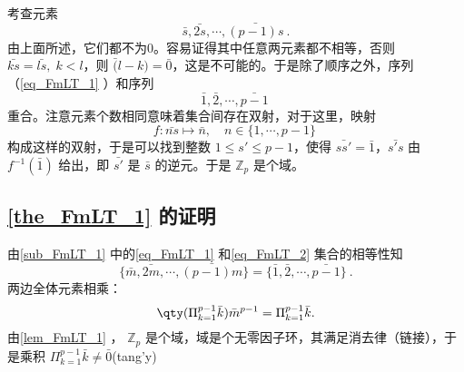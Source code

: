 考查元素 
\begin{equation}\label{eq_FmLT_1}
\bar s,\bar{2s},\cdots,\bar{(p-1)s}~.
\end{equation}
由上面所述，它们都不为0。容易证得其中任意两元素都不相等，否则 $\bar {ks}=\bar{ls},\;k<l$，则 $\bar(l-k)=\bar 0$，这是不可能的。于是除了顺序之外，序列（\autoref{eq_FmLT_1} ）和序列
\begin{equation}\label{eq_FmLT_2}
\bar 1,\bar 2,\cdots,\bar{p-1}~
\end{equation}
重合。注意元素个数相同意味着集合间存在双射，对于这里，映射
\begin{equation}
f:\bar{ns}\mapsto \bar n,\quad n\in\{1,\cdots,p-1\}~
\end{equation}
构成这样的双射，于是可以找到整数 $1\leq s'\leq p-1$，使得 $\bar{ss'}=\bar 1$，$\bar{s's}$ 由 $f^{-1}(\bar 1)$ 给出，即 $\bar{s'}$ 是 $\bar s$ 的逆元。于是 $\mathbb Z_p$ 是个域。
\subsection{\autoref{the_FmLT_1} 的证明}
由\autoref{sub_FmLT_1} 中的\autoref{eq_FmLT_1} 和\autoref{eq_FmLT_2} 集合的相等性知
\begin{equation}
\{\bar m,\bar{2m},\cdots,\bar{(p-1)m}\}=\{\bar 1,\bar 2,\cdots,\bar{p-1}\}~.
\end{equation}
两边全体元素相乘：
\begin{equation}
\qty(\Pi_{k=1}^{p-1}\bar k)\bar{m}^{p-1}=\Pi_{k=1}^{p-1}\bar k.
\end{equation}
由\autoref{lem_FmLT_1} ， $\mathbb Z_p$ 是个域，域是个无零因子环，其满足消去律（链接），于是乘积 $\Pi_{k=1}^{p-1}\bar k\neq\bar0$(tang'y)







